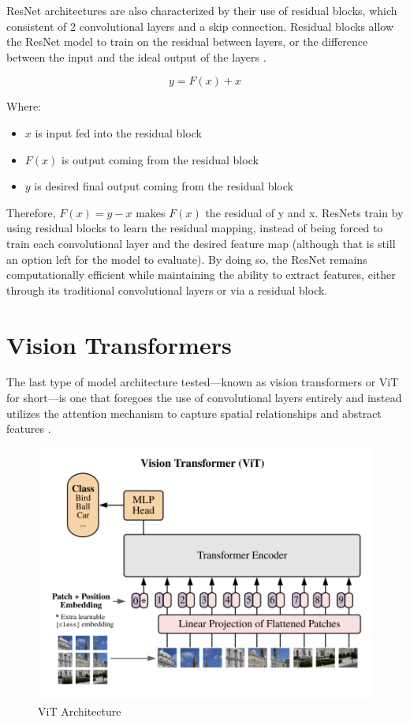 \documentclass [MAS] {uclathes}
\begin{document}
ResNet architectures are also characterized by their use of residual blocks, which consistent of 2 convolutional layers 
and a skip connection. Residual blocks allow the ResNet model to train on the residual between layers, or the difference 
between the input and the ideal output of the layers \cite{resnet}. 

\[y = F(x) + x\]

Where:
\begin{itemize}
    \item \(x\) is input fed into the residual block
    \item \(F(x)\) is output coming from the residual block
    \item \(y\) is desired final output coming from the residual block
\end{itemize}

Therefore, \(F(x) = y - x\) makes \(F(x)\) the residual of y and x. ResNets train by using residual blocks to learn the 
residual mapping, instead of being forced to train each convolutional layer and the desired feature map (although that 
is still an option left for the model to evaluate). By doing so, the ResNet remains computationally efficient while 
maintaining the ability to extract features, either through its traditional convolutional layers or via a residual 
block. 

\section{Vision Transformers}

The last type of model architecture tested---known as vision transformers or ViT for short---is one that foregoes the 
use of convolutional layers entirely and instead utilizes the attention mechanism to capture spatial relationships and 
abstract features \cite{vit}. 

\begin{figure} [H]
    \centering
    \includegraphics[width=0.6\linewidth]{figures/ViT Architecture.png}
    \caption{ViT Architecture \cite{vit}}
\end{figure}
\end{document}
